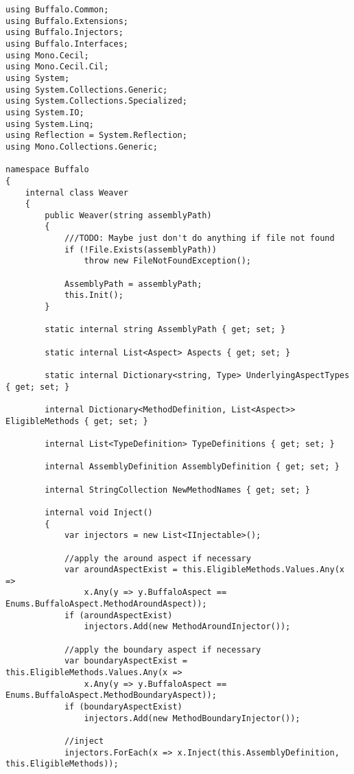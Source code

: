 \begin{lstlisting}[caption={../buffalo/Weaver.cs}, label=../buffalo/Weaver.cs, frame=tb, basicstyle=\scriptsize]﻿using Buffalo.Common;
using Buffalo.Extensions;
using Buffalo.Injectors;
using Buffalo.Interfaces;
using Mono.Cecil;
using Mono.Cecil.Cil;
using System;
using System.Collections.Generic;
using System.Collections.Specialized;
using System.IO;
using System.Linq;
using Reflection = System.Reflection;
using Mono.Collections.Generic;

namespace Buffalo
{
    internal class Weaver
    {
        public Weaver(string assemblyPath)
        {
            ///TODO: Maybe just don't do anything if file not found
            if (!File.Exists(assemblyPath))
                throw new FileNotFoundException();

            AssemblyPath = assemblyPath;
            this.Init();
        }

        static internal string AssemblyPath { get; set; }

        static internal List<Aspect> Aspects { get; set; }

        static internal Dictionary<string, Type> UnderlyingAspectTypes { get; set; }

        internal Dictionary<MethodDefinition, List<Aspect>> EligibleMethods { get; set; }

        internal List<TypeDefinition> TypeDefinitions { get; set; }

        internal AssemblyDefinition AssemblyDefinition { get; set; }

        internal StringCollection NewMethodNames { get; set; }

        internal void Inject()
        {
            var injectors = new List<IInjectable>();

            //apply the around aspect if necessary
            var aroundAspectExist = this.EligibleMethods.Values.Any(x => 
                x.Any(y => y.BuffaloAspect == Enums.BuffaloAspect.MethodAroundAspect));
            if (aroundAspectExist)
                injectors.Add(new MethodAroundInjector());

            //apply the boundary aspect if necessary
            var boundaryAspectExist = this.EligibleMethods.Values.Any(x =>
                x.Any(y => y.BuffaloAspect == Enums.BuffaloAspect.MethodBoundaryAspect));
            if (boundaryAspectExist)
                injectors.Add(new MethodBoundaryInjector());

            //inject
            injectors.ForEach(x => x.Inject(this.AssemblyDefinition, this.EligibleMethods));


\end{lstlisting}
